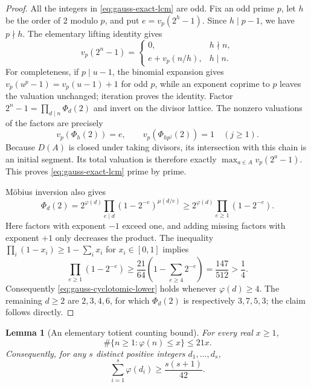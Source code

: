 \documentclass[11pt,a4paper]{article}
\newtheorem{lemma}[theorem]{Lemma}
\theoremstyle{definition}
\theoremstyle{remark}\newtheorem{remark}[theorem]{Remark}
\begin{document}
\begin{proof}
All the integers in \eqref{eq:gauss-exact-lcm} are odd.  Fix an odd
prime $p$, let $h$ be the order of $2$ modulo $p$, and put
$e=v_p(2^h-1)$.  Since $h\mid p-1$, we have $p\nmid h$.
The elementary lifting identity gives
\[
 v_p(2^n-1)=
 \begin{cases}0,&h\nmid n,\\ e+v_p(n/h),&h\mid n.\end{cases}
\]
For completeness, if $p\mid u-1$, the binomial expansion gives
$v_p(u^p-1)=v_p(u-1)+1$ for odd $p$, while an exponent coprime to
$p$ leaves the valuation unchanged; iteration proves the identity.
Factor $2^n-1=\prod_{d\mid n}\Phi_d(2)$ and invert on the divisor
lattice.  The nonzero valuations of the factors are precisely
\[
 v_p(\Phi_h(2))=e,\qquad
 v_p(\Phi_{hp^j}(2))=1\quad(j\geq1).
\]
Because $D(A)$ is closed under taking divisors, its intersection with
this chain is an initial segment.  Its total valuation is therefore
exactly $\max_{a\in A}v_p(2^a-1)$.  This proves
\eqref{eq:gauss-exact-lcm} prime by prime.

M\"obius inversion also gives
\[
 \Phi_d(2)=2^{\varphi(d)}
 \prod_{e\mid d}(1-2^{-e})^{\mu(d/e)}
 \geq 2^{\varphi(d)}\prod_{e\geq1}(1-2^{-e}).
\]
Here factors with exponent $-1$ exceed one, and adding missing factors
with exponent $+1$ only decreases the product.  The inequality
$\prod_i(1-x_i)\geq1-\sum_i x_i$ for $x_i\in[0,1]$ implies
\[
 \prod_{e\geq1}(1-2^{-e})
 \geq\frac{21}{64}\left(1-\sum_{e\geq4}2^{-e}\right)
 =\frac{147}{512}>\frac14.
\]
Consequently \eqref{eq:gauss-cyclotomic-lower} holds whenever
$\varphi(d)\geq4$.  The remaining $d\geq2$ are $2,3,4,6$,
for which $\Phi_d(2)$ is respectively $3,7,5,3$; the claim follows
directly.
\end{proof}

\begin{lemma}[An elementary totient counting bound]
\label{lem:gauss-totient}
For every real $x\geq1$,
\begin{equation}\label{eq:gauss-totient-count}
 \#\{n\geq1:\varphi(n)\leq x\}\leq21x.
\end{equation}
Consequently, for any $s$ distinct positive integers $d_1,\ldots,d_s$,
\begin{equation}\label{eq:gauss-totient-sum}
 \sum_{i=1}^s\varphi(d_i)\geq\frac{s(s+1)}{42}.
\end{equation}
\end{lemma}
\end{document}

